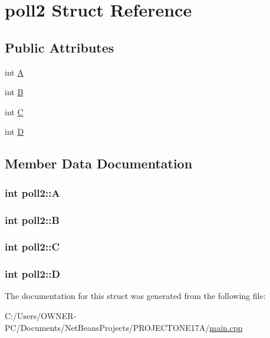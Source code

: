 \hypertarget{structpoll2}{\section{poll2 Struct Reference}
\label{structpoll2}
}
\subsection*{Public Attributes}
\begin{DoxyCompactItemize}
\item 
int \hyperlink{structpoll2_ab16f5a3f189ea65e426f8c3afb33f464}{A}
\item 
int \hyperlink{structpoll2_ad8f74687b9f603adefcd2af260f77ed0}{B}
\item 
int \hyperlink{structpoll2_a9df9a93dd66f0ee46cfe59e9ea7badf5}{C}
\item 
int \hyperlink{structpoll2_adc2ce6138703ea58deb55a2ce9ba7ed5}{D}
\end{DoxyCompactItemize}


\subsection{Member Data Documentation}
\hypertarget{structpoll2_ab16f5a3f189ea65e426f8c3afb33f464}{
\subsubsection[{A}]{\setlength{\rightskip}{0pt plus 5cm}int poll2\+::\+A}}\label{structpoll2_ab16f5a3f189ea65e426f8c3afb33f464}
\hypertarget{structpoll2_ad8f74687b9f603adefcd2af260f77ed0}{
\subsubsection[{B}]{\setlength{\rightskip}{0pt plus 5cm}int poll2\+::\+B}}\label{structpoll2_ad8f74687b9f603adefcd2af260f77ed0}
\hypertarget{structpoll2_a9df9a93dd66f0ee46cfe59e9ea7badf5}{
\subsubsection[{C}]{\setlength{\rightskip}{0pt plus 5cm}int poll2\+::\+C}}\label{structpoll2_a9df9a93dd66f0ee46cfe59e9ea7badf5}
\hypertarget{structpoll2_adc2ce6138703ea58deb55a2ce9ba7ed5}{
\subsubsection[{D}]{\setlength{\rightskip}{0pt plus 5cm}int poll2\+::\+D}}\label{structpoll2_adc2ce6138703ea58deb55a2ce9ba7ed5}


The documentation for this struct was generated from the following file\+:\begin{DoxyCompactItemize}
\item 
C\+:/\+Users/\+O\+W\+N\+E\+R-\/\+P\+C/\+Documents/\+Net\+Beans\+Projects/\+P\+R\+O\+J\+E\+C\+T\+O\+N\+E17\+A/\hyperlink{main_8cpp}{main.\+cpp}\end{DoxyCompactItemize}
